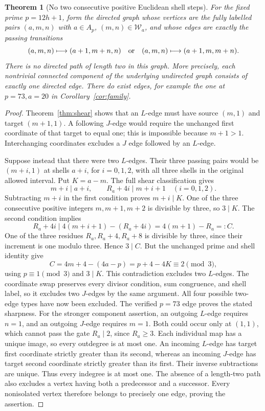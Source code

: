 \documentclass[11pt]{article}
\newtheorem{theorem}{Theorem}[section]
\theoremstyle{definition}\newtheorem{definition}[theorem]{Definition}
\theoremstyle{remark}\newtheorem{remark}[theorem]{Remark}
\begin{document}
\begin{theorem}[No two consecutive positive Euclidean shell steps]
\label{thm:no-two-shears}
For the fixed prime \(p=12h+1\), form the directed graph whose
vertices are the fully labelled pairs \((a,m,n)\) with
\(a\in A_p\), \((m,n)\in\mathcal W_a\), and whose edges
are exactly the passing transitions
\[
 (a,m,n)\longmapsto(a+1,m+n,n)
 \quad\hbox{or}\quad
 (a,m,n)\longmapsto(a+1,m,m+n).
\]
There is no directed path of length two in this graph.
More precisely, each nontrivial connected component of the
underlying undirected graph consists of exactly one directed edge.
There do exist edges, for example the one at \(p=73,a=20\)
in Corollary~\ref{cor:family}.
\end{theorem}
\begin{proof}
Theorem~\ref{thm:shear} shows that an \(L\)-edge must have
source \((m,1)\) and target \((m+1,1)\).  A following
\(J\)-edge would require the unchanged first coordinate
of that target to equal one; this is impossible because
\(m+1>1\).  Interchanging coordinates excludes a \(J\)
edge followed by an \(L\)-edge.

Suppose instead that there were two \(L\)-edges.  Their
three passing pairs would be \((m+i,1)\) at shells
\(a+i\), for \(i=0,1,2\), with all three shells in
the original allowed interval.  Put \(K=a-m\).
The full shear classification gives
\[
 m+i\mid a+i,\qquad R_a+4i\mid m+i+1
 \quad(i=0,1,2).
\]
Subtracting \(m+i\) in the first condition proves
\(m+i\mid K\).  One of the three consecutive positive
integers \(m,m+1,m+2\) is divisible by three, so
\(3\mid K\).  The second condition implies
\[
 R_a+4i\mid 4(m+i+1)-(R_a+4i)
                 =4(m+1)-R_a=:C .
\]
One of the three residues \(R_a,R_a+4,R_a+8\) is
divisible by three, since their increment is one
modulo three.  Hence \(3\mid C\).  But the unchanged
prime and shell identity give
\[
 C=4m+4-(4a-p)=p+4-4K\equiv2\pmod3,
\]
using \(p\equiv1\pmod3\) and \(3\mid K\).
This contradiction excludes two \(L\)-edges.
The coordinate swap preserves every divisor condition,
sum congruence, and shell label, so it excludes two
\(J\)-edges by the same argument.  All four possible
two-edge types have now been excluded.  The verified
\(p=73\) edge proves the stated sharpness.
For the stronger component assertion, an outgoing \(L\)-edge
requires \(n=1\), and an outgoing \(J\)-edge requires \(m=1\).
Both could occur only at \((1,1)\), which cannot pass the
gate \(R_a\mid2\), since \(R_a\ge3\).  Each individual
map has a unique image, so every outdegree is at most one.
An incoming \(L\)-edge has target first coordinate strictly
greater than its second, whereas an incoming \(J\)-edge has
target second coordinate strictly greater than its first.
Their inverse subtractions are unique.  Thus every
indegree is at most one.  The absence of a length-two
path also excludes a vertex having both a predecessor
and a successor.  Every nonisolated vertex therefore
belongs to precisely one edge, proving the assertion.
\end{proof}
\end{document}
